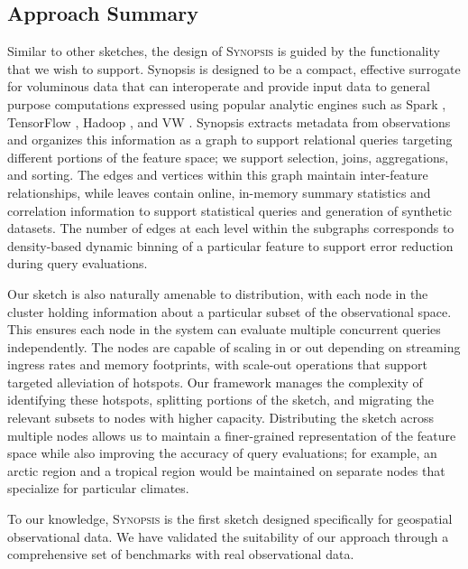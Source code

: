 \subsection{Approach Summary}
Similar to other sketches, the design of \textsc{Synopsis} is guided by the functionality that we wish to support. Synopsis is designed to be a compact, effective surrogate for voluminous data that can interoperate and provide input data to general purpose computations expressed using popular analytic engines such as Spark \cite{zaharia2010spark,armbrust2015spark}, TensorFlow \cite{abadi2016tensorflow,tensorflow}, Hadoop \cite{hadoop,shvachko2010hadoop,borthakur2008hdfs}, and VW \cite{langford2007vowpal}.   Synopsis extracts metadata from observations and organizes this information as a graph to support relational queries targeting different portions of the feature space; we support selection, joins, aggregations, and sorting. The edges and vertices within this graph maintain inter-feature relationships, while leaves contain online, in-memory summary statistics and correlation information to support statistical queries and generation of synthetic datasets.  The number of edges at each level within the subgraphs corresponds to density-based dynamic binning of a particular feature to support error reduction during query evaluations.

Our sketch is also naturally amenable to distribution, with each node in the cluster holding information about a particular subset of the observational space.  This ensures each node in the system can evaluate multiple concurrent queries independently. The nodes are capable of scaling in or out depending on streaming ingress rates and memory footprints, with scale-out operations that support targeted alleviation of hotspots. Our framework manages the complexity of identifying these hotspots, splitting portions of the sketch, and migrating the relevant subsets to nodes with higher capacity. Distributing the sketch across multiple nodes allows us to maintain a finer-grained representation of the feature space while also improving the accuracy of query evaluations; for example, an arctic region and a tropical region would be maintained on separate nodes that specialize for particular climates.

To our knowledge, \textsc{Synopsis} is the first sketch designed specifically for geospatial observational data. We have validated the suitability of our approach through a comprehensive set of benchmarks with real observational data. 

